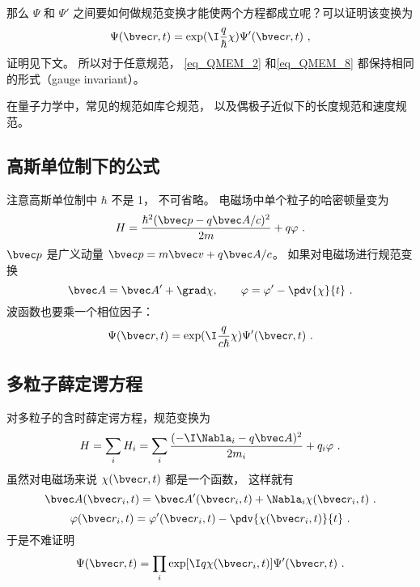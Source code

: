 那么 $\Psi$ 和 $\Psi'$ 之间要如何做规范变换才能使两个方程都成立呢？可以证明该变换为 
\begin{equation}\label{eq_QMEM_3}
\Psi(\bvec r, t) = \exp(\I \frac{q}{\hbar}\chi) \Psi'(\bvec r, t)~,
\end{equation}
证明见下文。 所以对于任意规范， \autoref{eq_QMEM_2} 和\autoref{eq_QMEM_8} 都保持相同的形式（gauge invariant）。

在量子力学中，常见的规范如库仑规范， 以及偶极子近似下的长度规范和速度规范。

\subsection{高斯单位制下的公式}
注意高斯单位制中 $\hbar$ 不是 1， 不可省略。 电磁场中单个粒子的哈密顿量变为
\begin{equation}
H = \frac{\hbar^2(\bvec p - q\bvec A/c)^2}{2m} + q\varphi~.
\end{equation}
$\bvec p$ 是广义动量 $\bvec p=m\bvec v+q\bvec A/c$。
如果对电磁场进行规范变换
\begin{equation}
\bvec A=\bvec A'+\grad \chi,\qquad \varphi =\varphi' - \pdv{\chi}{t}~.
\end{equation}
波函数也要乘一个相位因子：
\begin{equation}
\Psi(\bvec r,t)=\exp(\I\frac{q}{c\hbar} \chi)\Psi'(\bvec r,t)~.
\end{equation}

\subsection{多粒子薛定谔方程}
对多粒子的含时薛定谔方程，规范变换为
\begin{equation}
H = \sum_i H_i = \sum_i \frac{(-\I\Nabla_i - q\bvec A)^2}{2m_i} + q_i\varphi~.
\end{equation}
虽然对电磁场来说 $\chi(\bvec r, t)$ 都是一个函数， 这样就有
\begin{equation}
\bvec A(\bvec r_i, t) = \bvec A'(\bvec r_i, t) + \Nabla_i \chi(\bvec r_i, t)~.
\end{equation}
\begin{equation}
\varphi(\bvec r_i, t) = \varphi'(\bvec r_i, t) - \pdv{\chi(\bvec r_i, t)}{t}~.
\end{equation}
于是不难证明
\begin{equation}
\Psi(\bvec r,t)= \prod_i \exp[\I q\chi(\bvec r_i, t)]\Psi'(\bvec r,t)~.
\end{equation}

